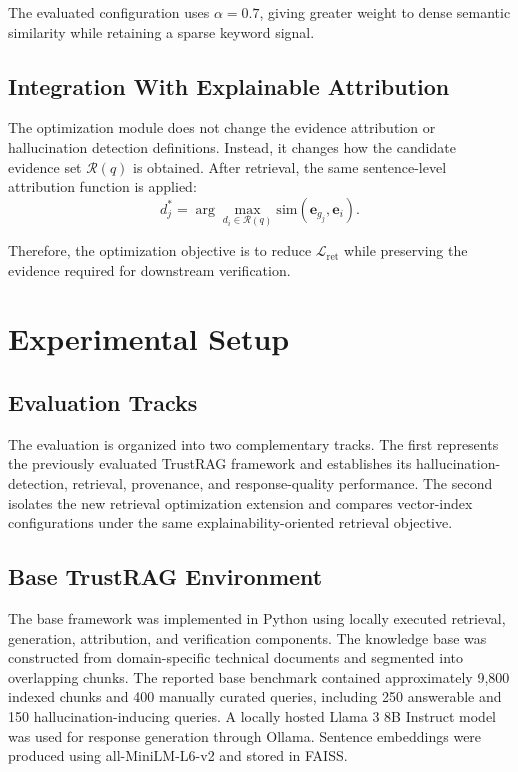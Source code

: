 \documentclass[conference]{IEEEtran}
\begin{document}
The evaluated configuration uses $\alpha=0.7$, giving greater weight to dense semantic similarity while retaining a sparse keyword signal.

\subsection{Integration With Explainable Attribution}

The optimization module does not change the evidence attribution or hallucination detection definitions. Instead, it changes how the candidate evidence set $\mathcal{R}(q)$ is obtained. After retrieval, the same sentence-level attribution function is applied:
\begin{equation}
d_j^*=
\arg\max_{d_i\in\mathcal{R}(q)}
\mathrm{sim}(\mathbf{e}_{g_j},\mathbf{e}_i).
\end{equation}

Therefore, the optimization objective is to reduce $\mathcal{L}_{\mathrm{ret}}$ while preserving the evidence required for downstream verification.

\section{Experimental Setup}

\subsection{Evaluation Tracks}

The evaluation is organized into two complementary tracks. The first represents the previously evaluated TrustRAG framework and establishes its hallucination-detection, retrieval, provenance, and response-quality performance. The second isolates the new retrieval optimization extension and compares vector-index configurations under the same explainability-oriented retrieval objective.

\subsection{Base TrustRAG Environment}

The base framework was implemented in Python using locally executed retrieval, generation, attribution, and verification components. The knowledge base was constructed from domain-specific technical documents and segmented into overlapping chunks. The reported base benchmark contained approximately 9,800 indexed chunks and 400 manually curated queries, including 250 answerable and 150 hallucination-inducing queries. A locally hosted Llama 3 8B Instruct model was used for response generation through Ollama. Sentence embeddings were produced using all-MiniLM-L6-v2 and stored in FAISS.
\end{document}
